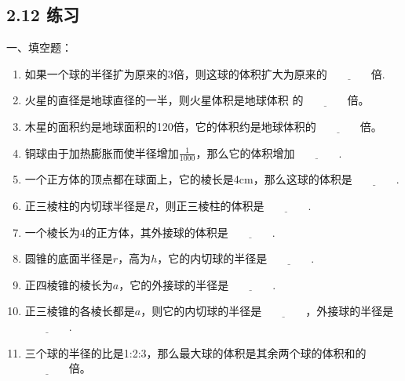 \subsection*{2.12 练习}

一、填空题：
\begin{enumerate}
    \item 如果一个球的半径扩为原来的3倍，则这球的体积扩大为原来的$\underline{\qquad\qquad}$倍.

    \item 火星的直径是地球直径的一半，则火星体积是地球体积
的$\underline{\qquad\qquad}$倍。

\item 木星的面积约是地球面积的120倍，它的体积约是地球体积的$\underline{\qquad\qquad}$倍。
\item 
铜球由于加热膨胀而使半径增加$\frac{1}{1000}$，那么它的体积增加$\underline{\qquad\qquad}$.

\item 一个正方体的顶点都在球面上，它的棱长是4cm，那么这球的体积是$\underline{\qquad\qquad}$.
\item 
正三棱柱的内切球半径是$R$，则正三棱柱的体积是$\underline{\qquad\qquad}$.
\item 
一个棱长为4的正方体，其外接球的体积是$\underline{\qquad\qquad}$.

\item 圆锥的底面半径是$r$，高为$h$，它的内切球的半径是$\underline{\qquad\qquad}$.
\item 
正四棱锥的棱长为$a$，它的外接球的半径是$\underline{\qquad\qquad}$.
\item 
正三棱锥的各棱长都是$a$，则它的内切球的半径是$\underline{\qquad\qquad}$，外接球的半径是$\underline{\qquad\qquad}$.
\item 
三个球的半径的比是1:2:3，那么最大球的体积是其余两个球的体积和的$\underline{\qquad\qquad}$倍。
\end{enumerate}


